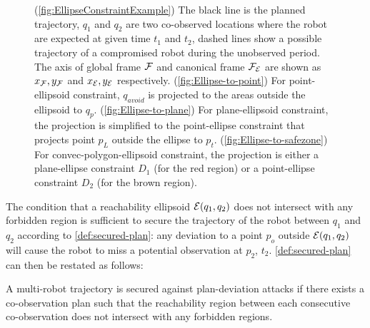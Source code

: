 \documentclass[10pt,twocolumn,twoside]{IEEEtran}
\newcommand{\news}{\color{blue}}
\begin{document}
\begin{figure}
    \caption{\news (\ref{fig:EllipseConstraintExample}) The black line is the planned trajectory, $q_1$ and $q_2$ are two co-observed locations where the robot are expected at given time $t_1$ and $t_2$, dashed lines show a possible trajectory of a compromised robot during the unobserved period. The axis of global frame $\mathcal{F}$ and canonical frame $\mathcal{F}_{\mathcal{E}}$ are shown as $x_{\mathcal{F}}, y_{\mathcal{F}}$ and $x_{\mathcal{E}}, y_{\mathcal{E}}$ respectively. 
    (\ref{fig:Ellipse-to-point}) For point-ellipsoid constraint, $q_{avoid}$ is projected to the areas outside the ellipsoid to $q_{p}$. 
    (\ref{fig:Ellipse-to-plane}) For plane-ellipsoid constraint, the projection is simplified to the point-ellipse constraint that projects point $p_{L}$ outside the ellipse to $p_{t}$.
    (\ref{fig:Ellipse-to-safezone}) For convec-polygon-ellipsoid constraint, the projection is either a plane-ellipse constraint $D_{1}$ (for the red region) or a point-ellipse constraint $D_{2}$ (for the brown region).}
    \label{fig:Reachability_full}
  \end{figure}

{\news The condition that a reachability ellipsoid $\mathcal{E}(q_1,q_2)$ does not intersect with any forbidden region is sufficient to secure the trajectory of the robot between $q_1$ and $q_2$ according to \cref{def:secured-plan}: any deviation to a point $p_o$ outside $\mathcal{E}(q_1,q_2)$ will cause the robot to miss a potential observation at $p_2$, $t_2$. \cref{def:secured-plan} can then be restated as follows:
\begin{definition}\label{rmk:revised-security}
  A multi-robot trajectory is secured against plan-deviation attacks if there exists a co-observation plan such that the reachability region between each consecutive co-observation does not intersect with any forbidden regions.
\end{definition}
}
\end{document}
